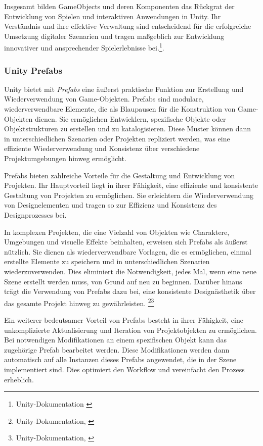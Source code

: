 Insgesamt bilden GameObjects und deren Komponenten das Rückgrat der Entwicklung von Spielen und interaktiven Anwendungen in
Unity. Ihr Verständnis und ihre effektive Verwaltung sind entscheidend für die erfolgreiche Umsetzung digitaler Szenarien
und tragen maßgeblich zur Entwicklung innovativer und ansprechender Spielerlebnisse bei.\footnote{Unity-Dokumentation \cite{GameObjects}}.

\subsubsection{Unity Prefabs}

Unity bietet mit \textit{Prefabs} eine äußerst praktische Funktion zur Erstellung und Wiederverwendung von Game-Objekten. Prefabs sind modulare, wiederverwendbare Elemente, die als Blaupausen für die Konstruktion von Game-Objekten dienen. Sie ermöglichen Entwicklern, spezifische Objekte oder Objektstrukturen zu erstellen und zu katalogisieren. Diese Muster können dann in unterschiedlichen Szenarien oder Projekten repliziert werden, was eine effiziente Wiederverwendung und Konsistenz über verschiedene Projektumgebungen hinweg ermöglicht.

Prefabs bieten zahlreiche Vorteile für die Gestaltung und Entwicklung von Projekten. Ihr Hauptvorteil liegt in ihrer Fähigkeit, eine effiziente und konsistente Gestaltung von Projekten zu ermöglichen. Sie erleichtern die Wiederverwendung von Designelementen und tragen so zur Effizienz und Konsistenz des Designprozesses bei.

In komplexen Projekten, die eine Vielzahl von Objekten wie Charaktere, Umgebungen und visuelle Effekte beinhalten, erweisen sich Prefabs als äußerst nützlich. Sie dienen als wiederverwendbare Vorlagen, die es ermöglichen, einmal erstellte Elemente zu speichern und in unterschiedlichen Szenarien wiederzuverwenden. Dies eliminiert die Notwendigkeit, jedes Mal, wenn eine neue Szene erstellt werden muss, von Grund auf neu zu beginnen. Darüber hinaus trägt die Verwendung
von Prefabs dazu bei, eine konsistente Designästhetik über das gesamte Projekt hinweg zu gewährleisten. \footnote{Unity-Dokumentation, \cite{Prefabs}}\footnote{Unity-Dokumentation, \cite{Prefabs-2}}


Ein weiterer bedeutsamer Vorteil von Prefabs besteht in ihrer Fähigkeit, eine unkomplizierte Aktualisierung und Iteration von Projektobjekten zu ermöglichen. Bei notwendigen Modifikationen an einem spezifischen Objekt kann das zugehörige Prefab bearbeitet werden. Diese Modifikationen werden dann automatisch auf alle Instanzen dieses Prefabs angewendet, die in der Szene implementiert sind. Dies optimiert den Workflow und vereinfacht den Prozess erheblich.

